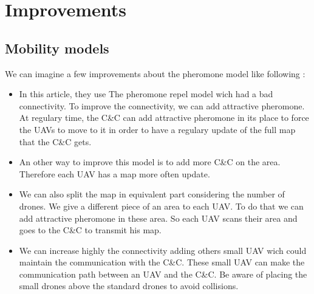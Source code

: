 \chapter{Improvements}

\section{Mobility models}

We can imagine a few improvements about the pheromone model like following :\\

\begin{itemize}

\item In this article, they use The pheromone repel model wich had a bad connectivity. To improve the connectivity, we can add attractive pheromone. At regulary time, the C\&C can add attractive pheromone in its place to force the UAVs to move to it in order to have a regulary update of the full map that the C\&C gets.

\item An other way to improve this model is to add more C\&C on the area. Therefore each UAV has a map more often update.

\item We can also split the map in equivalent part considering the number of drones. We give a different piece of an area to each UAV. To do that we can add attractive pheromone in these area. So each UAV scans their area and goes to the C\&C to transmit his map.

\item We can increase highly the connectivity adding others small UAV wich could maintain the communication with the C\&C. These small UAV can make the communication path between an UAV and the C\&C. Be aware of placing the small drones above the standard drones to avoid collisions.

\end{itemize}


